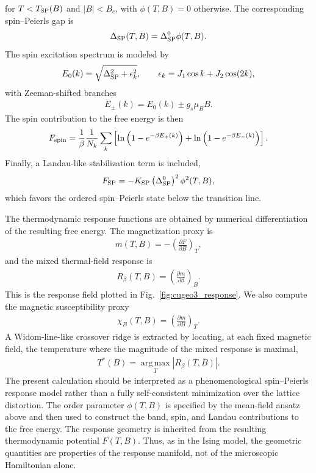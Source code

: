 for \(T<T_{\rm SP}(B)\) and \(|B|<B_c\), with
\(\phi(T,B)=0\) otherwise. The corresponding spin--Peierls gap is
\begin{align}
\Delta_{\rm SP}(T,B)
=
\Delta_{\rm SP}^{0}\phi(T,B).
\end{align}
The spin excitation spectrum is modeled by
\begin{align}
E_0(k)
=
\sqrt{
\Delta_{\rm SP}^2
+
\epsilon_k^2
},
\qquad
\epsilon_k
=
J_1\cos k+J_2\cos(2k),
\end{align}
with Zeeman-shifted branches
\begin{align}
E_{\pm}(k)
=
E_0(k)
\pm
g_s\mu_B B.
\end{align}
The spin contribution to the free energy is then
\begin{align}
F_{\rm spin}
=
\frac{1}{\beta}
\frac{1}{N_k}
\sum_k
\left[
\ln\left(1-e^{-\beta E_+(k)}\right)
+
\ln\left(1-e^{-\beta E_-(k)}\right)
\right].
\end{align}
Finally, a Landau-like stabilization term is included,
\begin{align}
F_{\rm SP}
=
-K_{\rm SP}
\left(\Delta_{\rm SP}^{0}\right)^2
\phi^2(T,B),
\end{align}
which favors the ordered spin--Peierls state below the transition
line.

The thermodynamic response functions are obtained by numerical
differentiation of the resulting free energy. The magnetization proxy
is
\begin{align}
m(T,B)
=
-
\left(
\frac{\partial F}{\partial B}
\right)_T,
\end{align}
and the mixed thermal-field response is
\begin{align}
R_\beta(T,B)
=
\left(
\frac{\partial m}{\partial\beta}
\right)_B.
\end{align}
This is the response field plotted in
Fig.~\ref{fig:cugeo3_response}. We also compute the magnetic
susceptibility proxy
\begin{align}
\chi_B(T,B)
=
\left(
\frac{\partial m}{\partial B}
\right)_T.
\end{align}
A Widom-line-like crossover ridge is extracted by locating, at each
fixed magnetic field, the temperature where the magnitude of the
mixed response is maximal,
\begin{align}
T^\ast(B)
=
\operatorname*{arg\,max}_{T}
\left|
R_\beta(T,B)
\right|.
\end{align}
The present calculation should be interpreted as a phenomenological
spin--Peierls response model rather than a fully self-consistent
minimization over the lattice distortion. The order parameter
\(\phi(T,B)\) is specified by the mean-field ansatz above and then
used to construct the band, spin, and Landau contributions to the
free energy. The response geometry is inherited from the resulting
thermodynamic potential \(F(T,B)\). Thus, as in the Ising model, the
geometric quantities are properties of the response manifold, not of
the microscopic Hamiltonian alone.


